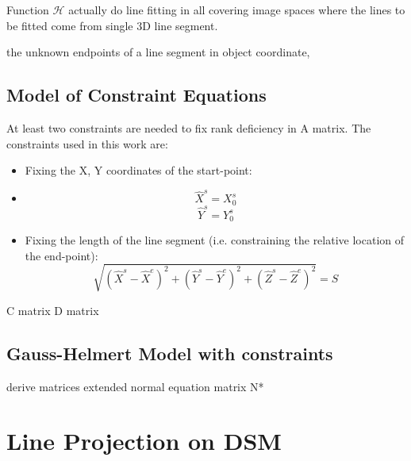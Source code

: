 Function $\mathcal{H}$ actually do line fitting in all covering image spaces where the lines to be fitted come from single 3D line segment. 


the unknown endpoints of a line segment  in object coordinate, 



\subsection{Model of Constraint Equations}
\label{subsec:ConEqua}
At least two constraints are needed to fix rank deficiency in A matrix. The constraints used in this work are:
\begin{itemize}
\item Fixing the X, Y coordinates of the start-point:
\item [] \begin{equation} \label{eq:constraint1}
\hat{X}^s=X^s_0
\end{equation}
\begin{equation} \label{eq:constraint2}
\hat{Y}^s=Y^s_0
\end{equation}
\item Fixing the length of the line segment (i.e. constraining the relative location of the end-point):
\begin{equation} \label{eq:constraint3}
\sqrt{(\hat{X}^s-\hat{X}^e)^2+(\hat{Y}^s-\hat{Y}^e)^2+(\hat{Z}^s-\hat{Z}^e)^2}=S
\end{equation}
\end{itemize}


C matrix
D matrix

\subsection{Gauss-Helmert Model with constraints}
\label{subsec:LSadj}



derive matrices
extended normal equation matrix N*


\section{Line Projection on DSM}
\label{sec:LineProjectionOnDSM}

